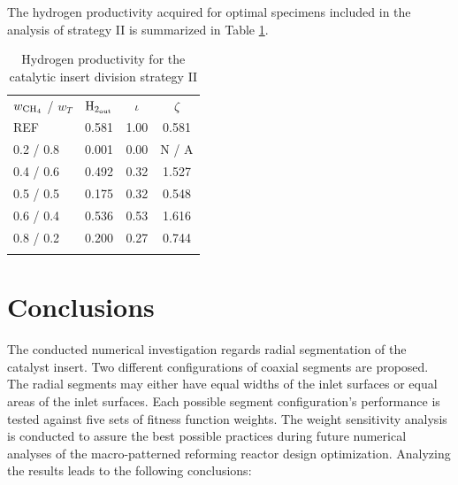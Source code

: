 \documentclass[preprint,12pt]{elsarticle}
\begin{document}

The hydrogen productivity acquired for optimal specimens included in the analysis of strategy II is summarized in Table \ref{tab:5REqH2prod}. 


\begin{center}
\begin{table}
\centering
\caption{Hydrogen productivity for the catalytic insert division strategy II}
\label{tab:5REqH2prod}
\begin{tabular}{l|c|c|c}
\hline\noalign{\smallskip}
 $w_{\rm{CH_4}}$ / $ w_T $ & $\rm{H_{2_{out}}}$ & $\iota$ & $\zeta$ \\
\noalign{\smallskip}\hline\noalign{\smallskip}
REF         & 0.581     & 1.00  &  0.581\\
0.2 / 0.8   & 0.001     & 0.00  & N / A \\
0.4 / 0.6   & 0.492     & 0.32  & 1.527 \\
0.5 / 0.5   & 0.175     & 0.32  & 0.548 \\
0.6 / 0.4   & 0.536     & 0.53  & 1.616 \\
0.8 / 0.2   & 0.200     & 0.27  & 0.744 \\
\noalign{\smallskip}\hline
\end{tabular}
\end{table}
\end{center}

\clearpage


\section{Conclusions}

The conducted numerical investigation regards radial segmentation of the catalyst insert. Two different configurations of coaxial segments are proposed. The radial segments may either have equal widths of the inlet surfaces or equal areas of the inlet surfaces. Each possible segment configuration's performance is tested against five sets of fitness function weights. The weight sensitivity analysis is conducted to assure the best possible practices during future numerical analyses of the macro-patterned reforming reactor design optimization. Analyzing the results leads to the following conclusions:
\end{document}
